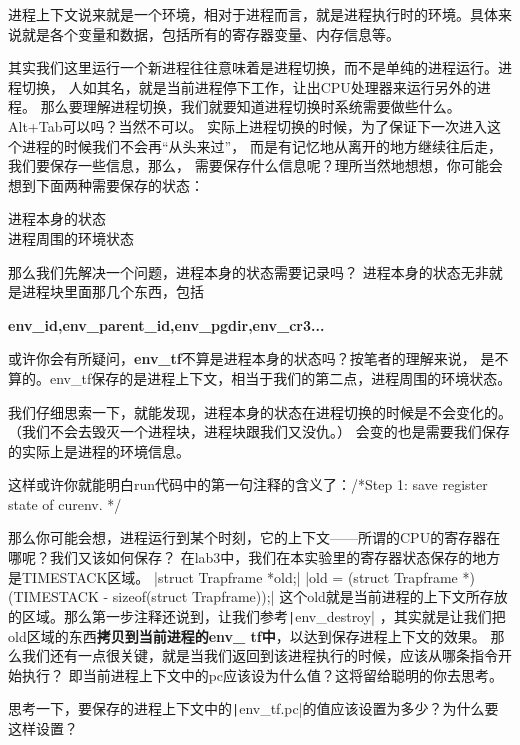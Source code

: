 \begin{note}
进程上下文说来就是一个环境，相对于进程而言，就是进程执行时的环境。具体来说就是各个变量和数据，包括所有的寄存器变量、内存信息等。
\end{note}

其实我们这里运行一个新进程往往意味着是进程切换，而不是单纯的进程运行。进程切换，
人如其名，就是当前进程停下工作，让出CPU处理器来运行另外的进程。
那么要理解进程切换，我们就要知道进程切换时系统需要做些什么。Alt+Tab可以吗？当然不可以。
实际上进程切换的时候，为了保证下一次进入这个进程的时候我们不会再“从头来过”，
而是有记忆地从离开的地方继续往后走，我们要保存一些信息，那么，
需要保存什么信息呢？理所当然地想想，你可能会想到下面两种需要保存的状态：
\begin{description}
\item[进程本身的状态]
\item[进程周围的环境状态]
\end{description}

那么我们先解决一个问题，进程本身的状态需要记录吗？
进程本身的状态无非就是进程块里面那几个东西，包括

\textbf{env\_id,env\_parent\_id,env\_pgdir,env\_cr3...}

或许你会有所疑问，\textbf{env\_tf}不算是进程本身的状态吗？按笔者的理解来说，
是不算的。env\_tf保存的是进程上下文，相当于我们的第二点，进程周围的环境状态。

我们仔细思索一下，就能发现，进程本身的状态在进程切换的时候是不会变化的。
（我们不会去毁灭一个进程块，进程块跟我们又没仇。）
会变的也是需要我们保存的实际上是进程的环境信息。

这样或许你就能明白run代码中的第一句注释的含义了：/*Step 1: save register state of curenv. */


那么你可能会想，进程运行到某个时刻，它的上下文——所谓的CPU的寄存器在哪呢？我们又该如何保存？
在lab3中，我们在本实验里的寄存器状态保存的地方是TIMESTACK区域。
|struct Trapframe  *old;|
|old = (struct Trapframe *)(TIMESTACK - sizeof(struct Trapframe));|
这个old就是当前进程的上下文所存放的区域。那么第一步注释还说到，让我们参考\texttt|env_destroy|
，其实就是让我们把old区域的东西\textbf{拷贝到当前进程的env\_ tf中}，以达到保存进程上下文的效果。
那么我们还有一点很关键，就是当我们返回到该进程执行的时候，应该从哪条指令开始执行？
即当前进程上下文中的pc应该设为什么值？这将留给聪明的你去思考。

\begin{thinking}\label{think-pc}
思考一下，要保存的进程上下文中的\texttt|env_tf.pc|的值应该设置为多少？为什么要这样设置？
\end{thinking}

